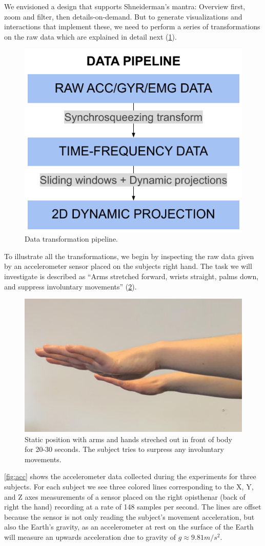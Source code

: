 We envisioned a design that supports Shneiderman's mantra: Overview first, zoom and filter, then details-on-demand. But to generate visualizations and interactions that implement these, we need to perform a series of transformations on the raw data which are explained in detail next (\cref{fig:nemo-pipe}). 

\begin{figure}[ht]
\centering
\includegraphics[width=.5\linewidth]{figures/nemo/simple-pipeline.pdf}
\caption{Data transformation pipeline.}
\label{fig:nemo-pipe}
\end{figure}

To illustrate all the transformations, we begin by inspecting the raw data given by an accelerometer sensor placed on the subjects right hand. The task we will investigate is described as ``Arms stretched forward, wrists straight, palms down, and suppress involuntary movements'' (\cref{fig:hands}).

\begin{figure}[ht]
\centering
\includegraphics[width=.5\linewidth]{figures/nemo/hands.png}
\caption{Static position with arms and hands streched out in front of body for 20-30 seconds. The subject tries to surpress any involuntary movements.}
\label{fig:hands}
\end{figure}

\cref{fig:acc} shows the accelerometer data collected during the experiments for three subjects. For each subject we see three colored lines corresponding to the X, Y, and Z axes measurements of a sensor placed on the right opisthenar (back of right the hand) recording at a rate of 148 samples per second. The lines are offset because the sensor is not only reading the subject's movement acceleration, but also the Earth's gravity, as an accelerometer at rest on the surface of the Earth will measure an upwards acceleration due to gravity of $g \approx 9.81 m/s^2$. 

